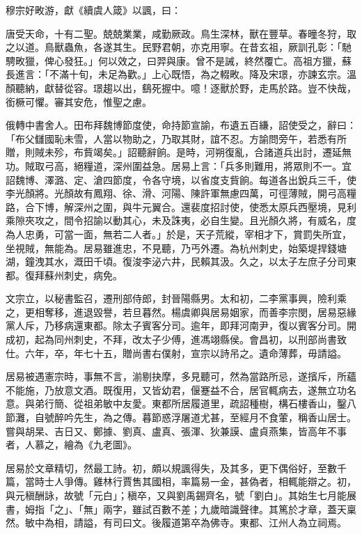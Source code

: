 \begin{pinyinscope}
 穆宗好畋游，獻《續虞人箴》以諷，曰：



 唐受天命，十有二聖。兢兢業業，咸勤厥政。鳥生深林，獸在豐草。春曈冬狩，取之以道。鳥獸蟲魚，各遂其生。民野君朝，亦克用寧。在昔玄祖，厥訓孔彰：「馳騁畋獵，俾心發狂。」何以效之，曰羿與康。曾不是誡，終然覆亡。高祖方獵，蘇長進言：「不滿十旬，未足為歡。」上心既悟，為之輟畋。降及宋璟，亦諫玄宗。溫顏聽納，獻替從容。璟趨以出，鷂死握中。噫！逐獸於野，走馬於路。豈不快哉，銜橛可懼。審其安危，惟聖之慮。



 俄轉中書舍人。田布拜魏博節度使，命持節宣諭，布遺五百縑，詔使受之，辭曰：「布父讎國恥未雪，人當以物助之，乃取其財，誼不忍。方諭問旁午，若悉有所贈，則賊未殄，布貲竭矣。」詔聽辭餉。是時，河朔復亂，合諸道兵出討，遷延無功。賊取弓高，絕糧道，深州圍益急。居易上言：「兵多則難用，將眾則不一。宜詔魏博、澤潞、定、滄四節度，令各守境，以省度支貲餉。每道各出銳兵三千，使李光顏將。光顏故有鳳翔、徐、滑、河陽、陳許軍無慮四萬，可徑薄賊，開弓高糧路，合下博，解深州之圍，與牛元翼合。還裴度招討使，使悉太原兵西壓境，見利乘隙夾攻之，間令招諭以動其心，未及誅夷，必自生變。且光顏久將，有威名，度為人忠勇，可當一面，無若二人者。」於是，天子荒縱，宰相才下，賞罰失所宜，坐視賊，無能為。居易雖進忠，不見聽，乃丐外遷。為杭州刺史，始築堤捍錢塘湖，鐘洩其水，溉田千頃。復浚李泌六井，民賴其汲。久之，以太子左庶子分司東都。復拜蘇州刺史，病免。



 文宗立，以秘書監召，遷刑部侍郎，封晉陽縣男。太和初，二李黨事興，險利乘之，更相奪移，進退毀譽，若旦暮然。楊虞卿與居易姻家，而善李宗閔，居易惡緣黨人斥，乃移病還東都。除太子賓客分司。逾年，即拜河南尹，復以賓客分司。開成初，起為同州刺史，不拜，改太子少傅，進馮翊縣侯。會昌初，以刑部尚書致仕。六年，卒，年七十五，贈尚書右僕射，宣宗以詩吊之。遺命薄葬，毋請謚。



 居易被遇憲宗時，事無不言，湔剔抉摩，多見聽可，然為當路所忌，遂擯斥，所蘊不能施，乃放意文酒。既復用，又皆幼君，偃蹇益不合，居官輒病去，遂無立功名意。與弟行簡、從祖弟敏中友愛。東都所居履道里，疏詔種樹，構石樓香山，鑿八節灘，自號醉吟先生，為之傳。暮節惑浮屠道尤甚，至經月不食葷，稱香山居士。嘗與胡杲、吉日又、鄭據、劉真、盧真、張渾、狄兼謨、盧貞燕集，皆高年不事者，人慕之，繪為《九老圖》。



 居易於文章精切，然最工詩。初，頗以規諷得失，及其多，更下偶俗好，至數千篇，當時士人爭傳。雞林行賈售其國相，率篇易一金，甚偽者，相輒能辯之。初，與元稹酬詠，故號「元白」；稹卒，又與劉禹錫齊名，號「劉白」。其始生七月能展書，姆指「之」、「無」兩字，雖試百數不差；九歲暗識聲律。其篤於才章，蓋天稟然。敏中為相，請謚，有司曰文。後履道第卒為佛寺。東都、江州人為立祠焉。




\end{pinyinscope}
